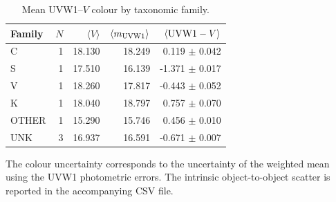 \begin{table}[t]
\centering
\scriptsize
\caption{Mean UVW1--$V$ colour by taxonomic family.}
\label{tab:taxonomy_colour_summary}
\begin{tabular}{lrrrr}
\hline
Family & $N$ & $\langle V \rangle$ & $\langle m_{\rm UVW1} \rangle$ & $\langle {\rm UVW1}-V \rangle$ \\
\hline
C & 1 & 18.130 & 18.249 & 0.119 $\pm$ 0.042 \\
S & 1 & 17.510 & 16.139 & -1.371 $\pm$ 0.017 \\
V & 1 & 18.260 & 17.817 & -0.443 $\pm$ 0.052 \\
K & 1 & 18.040 & 18.797 & 0.757 $\pm$ 0.070 \\
OTHER & 1 & 15.290 & 15.746 & 0.456 $\pm$ 0.010 \\
UNK & 3 & 16.937 & 16.591 & -0.671 $\pm$ 0.007 \\
\hline
\end{tabular}

\vspace{0.5ex}
\footnotesize
The colour uncertainty corresponds to the uncertainty of the weighted mean using the UVW1 photometric errors. The intrinsic object-to-object scatter is reported in the accompanying CSV file.
\end{table}
